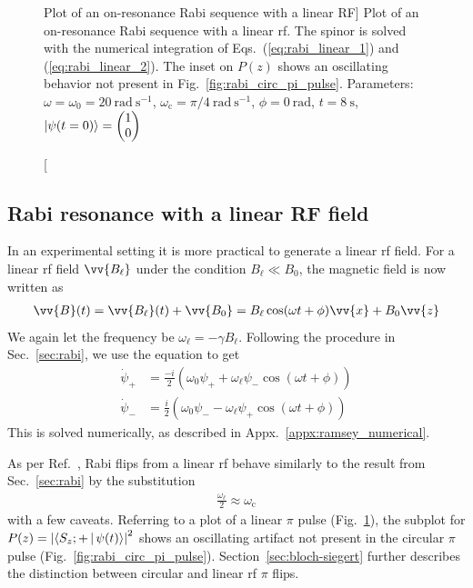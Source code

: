 \begin{figure}
\begin{subfigure}{.45\textwidth}
\end{subfigure}
\caption
[Plot of an on-resonance Rabi sequence with a linear RF]
{Plot of an on-resonance Rabi sequence with a linear \acrshort{rf}. The spinor is solved with the numerical integration of Eqs.~(\ref{eq:rabi_linear_1}) and (\ref{eq:rabi_linear_2}). The inset on $P(z)$ shows an oscillating behavior not present in Fig.~\ref{fig:rabi_circ_pi_pulse}. Parameters: $\omega=\omega_0=\qty{20}{\radian\ \s^{-1}}$, $\omega_\text{c}=\pi/\qty{4}{\radian\ \s^{-1}}$, $\phi=\qty{0}{\radian}$, $t=\qty{8}{\s}$, $\Ket{\psi(t=0)}=\left( \begin{matrix}
    1 \\
    0
\end{matrix}\right)$}
\label{fig:rabi_linear_pi_pulse}
\end{figure}



\subsection{Rabi resonance with a linear RF field}


In an experimental setting it is more practical to generate a linear \acrshort*{rf} field. For a linear \acrshort*{rf} field $\vv{B_\ell}$ under the condition $B_\ell \ll B_0$, the magnetic field is now written as
%
\begin{gather}
    \vv{B}(t)=\vv{B_\ell}(t) + \vv{B_0}=B_\ell \cos (\omega t + \phi) \vv{x} + B_0 \vv{z}\label{eq:B0_with_linear_rf}
\end{gather}
%
We again let the frequency be $\omega_\ell=-\gamma B_\ell$. Following the procedure in Sec.~\ref{sec:rabi}, we use the \schrodinger equation to get
%
\begin{align}
    \dot{\psi}_+ &=\frac{-i}{2}\left( \omega_0 \psi_+ + \omega_\ell \psi_-  \cos(\omega t + \phi) \right)\label{eq:rabi_linear_1}\\
    \dot{\psi}_- &=\frac{i}{2}\left( \omega_0 \psi_- - \omega_\ell \psi_+ \cos(\omega t + \phi)  \right)\label{eq:rabi_linear_2}
\end{align}
%
This is solved numerically, as described in Appx.~\ref{appx:ramsey_numerical}.

As per Ref.~\cite{rabi_1938}, Rabi flips from a linear \acrshort*{rf} behave similarly to the result from  Sec.~\ref{sec:rabi} by the substitution 
%
\begin{gather}
    \frac{\omega_\ell}{2}\approx\omega_\text{c} \label{eq:linear_vs_circular_w}
\end{gather}
%
with a few caveats. Referring to a plot of a linear $\pi$ pulse (Fig.~\ref{fig:rabi_linear_pi_pulse}), the subplot for $P(z)=\left| \Braket{S_z;+ | \psi(t)} \right|^2 $ shows an oscillating artifact not present in the circular $\pi$ pulse (Fig.~\ref{fig:rabi_circ_pi_pulse}). Section~\ref{sec:bloch-siegert} further describes the distinction between circular and linear \acrshort*{rf} $\pi$ flips.

